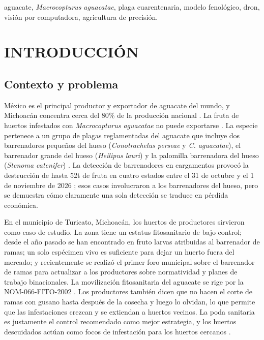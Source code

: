 \documentclass[conference]{IEEEtran}
\begin{document}
\begin{IEEEkeywords}
aguacate, \textit{Macrocopturus aguacatae}, plaga cuarentenaria, modelo fenológico, dron, visión por computadora, agricultura de precisión.
\end{IEEEkeywords}
\section{INTRODUCCIÓN}

\subsection{Contexto y problema}
México es el principal productor y exportador de aguacate del mundo, y Michoacán concentra cerca del 80\% de la producción nacional \cite{ref1}. La fruta de huertos infestados con \textit{Macrocopturus aguacatae} no puede exportarse \cite{ref1}. La especie pertenece a un grupo de plagas reglamentadas del aguacate que incluye dos barrenadores pequeños del hueso (\textit{Conotrachelus perseae} y \textit{C. aguacatae}), el barrenador grande del hueso (\textit{Heilipus lauri}) y la palomilla barrenadora del hueso (\textit{Stenoma catenifer}) \cite{ref1, ref2}. La detección de barrenadores en cargamentos provocó la destrucción de hasta 52t de fruta en cuatro estados entre el 31 de octubre y el 1 de noviembre de 2026 \cite{ref3, ref4}; esos casos involucraron a los barrenadores del hueso, pero se demuestra cómo claramente una sola detección se traduce en pérdida económica.

En el municipio de Turicato, Michoacán, los huertos de productores sirvieron como caso de estudio. La zona tiene un estatus fitosanitario de bajo control; desde el año pasado se han encontrado en fruto larvas atribuidas al barrenador de ramas; un solo espécimen vivo es suficiente para dejar un huerto fuera del mercado; y recientemente se realizó el primer foro municipal sobre el barrenador de ramas para actualizar a los productores sobre normatividad y planes de trabajo binacionales. La movilización fitosanitaria del aguacate se rige por la NOM-066-FITO-2002 \cite{ref5}. Los productores también dicen que no hacen el corte de ramas con gusano hasta después de la cosecha y luego lo olvidan, lo que permite que las infestaciones crezcan y se extiendan a huertos vecinos. La poda sanitaria es justamente el control recomendado como mejor estrategia, y los huertos descuidados actúan como focos de infestación para los huertos cercanos \cite{ref1}.
\end{document}
